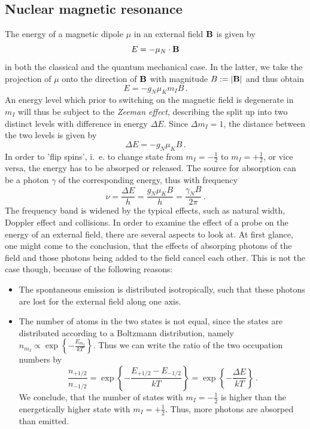 \subsection{Nuclear magnetic resonance}
The energy of a magnetic dipole $\mu$ in an external field $\mathbf{B}$ is given by 
\begin{equation}
    E = - \mu_N \cdot \mathbf{B}
\end{equation}
in both the classical and the quantum mechanical case. In the latter, 
we take the projection of $\mu$ onto the direction of $\mathbf{B}$ with magnitude 
$B := |\mathbf{B}|$ and thus obtain 
\begin{equation}
    E = - g_N \mu_K m_I B \, .
\end{equation}
An energy level which prior to switching on the magnetic field is degenerate in $m_I$ 
will thus be subject to the \emph{Zeeman effect}, describing the split up into two 
distinct levels with difference in energy $\Delta E$. Since $\Delta m_I = 1$, the 
distance between the two levels is given by 
\begin{equation}
    \Delta E = - g_N \mu_K B \, .
\end{equation}
In order to 'flip spins', i.~e. to change state from $m_I = - \frac{1}{2}$ to $m_I = + \frac{1}{2}$, 
or vice versa, the energy has to be absorped or released. The source for absorption can be a photon $\gamma$
of the corresponding energy, thus with frequency 
\begin{equation}
    \nu = \frac{\Delta E}{h} = \frac{g_N \mu_K B}{h} = \frac{\gamma_N B}{2 \pi}\, .
    \label{eq:nu}
\end{equation}
The frequency band is widened by the typical effects, such as natural width, Doppler effect 
and collisions. 
In order to examine the effect of a probe on the energy of an external field, there are several
aspects to look at. At first glance, one might come to the conclusion, that the effects of 
absorping photons of the field and those photons being added to the field cancel each other. 
This is not the case though, because of the following reasons:
\begin{itemize}
    \item
        The spontaneous emission is distributed isotropically, such that these photons are lost for 
        the external field along one axis.
    \item
        The number of atoms in the two states is not equal, since the states are distributed according to 
        a Boltzmann distribution, namely $n_{m_I} \propto \exp\left\{-\frac{E_{m_I}}{kT}\right\}$. 
        Thus we can write the ratio of the two occupation numbers by
        \begin{equation}
            \frac{n_{+1/2}}{n_{-1/2}} 
                = \exp\left\{-\frac{E_{+1/2} - E_{-1/2}}{kT} \right\}
                = \exp\left\{-\frac{\Delta E}{kT} \right\} \, .
        \end{equation}
        We conclude, that the number of states with $m_I = -\frac{1}{2}$ is higher than the energetically 
        higher state with $m_I = +\frac{1}{2}$. Thus, more photons are absorped than emitted. 
\end{itemize}
